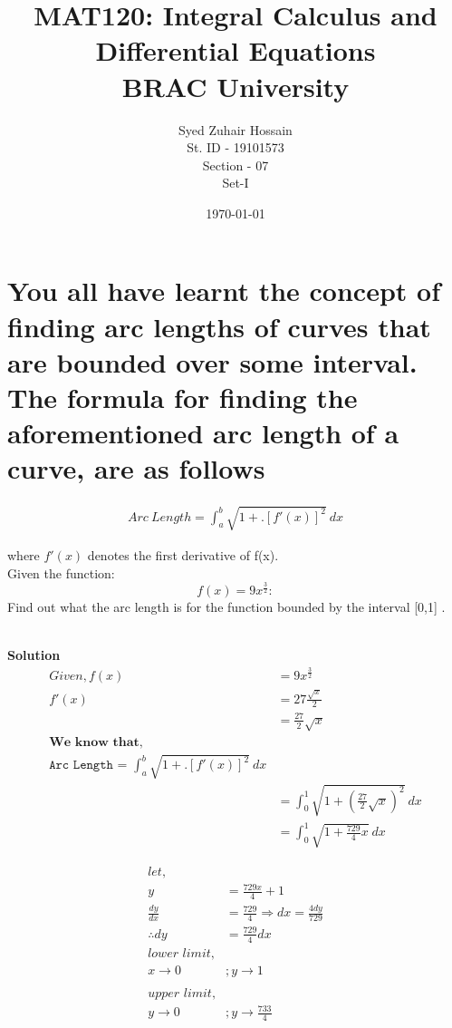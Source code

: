 \documentclass[12pt]{article}
\begin{document}
\title{MAT120: Integral Calculus and
Differential Equations \\
BRAC University}

\author{Syed Zuhair Hossain \\ St. ID - 19101573 \\ Section - 07 \\ Set-I}
\date{\today}
\maketitle


\section{You all have learnt the concept of finding arc lengths of curves that are bounded
over some interval. The formula for finding the aforementioned arc length of a curve, are as follows}


\begin{align*}
    Arc \ Length =  \int_{a}^{b} \sqrt{1+.[f{'}(x)]^2} \ dx
\end{align*}

\begin{paragraph}
where $f{'}(x)$ denotes the first derivative of f(x).\\
Given the function:\\
$$f(x) = 9x^\frac{3}{2}:$$Find out what the arc length is for the function bounded by the interval [0,1] .
\end{paragraph}\\

\textbf{Solution}
\begin{align*}
    Given, f(x) &= 9x^\frac{3}{2}\\
    f{'}(x) &= 27 \frac{\sqrt{x}}{2}\\
            &= \frac{27}{2}\sqrt{x}\\
    \textbf{We know that,} \\
    \texttt{Arc Length = $\int_{a}^{b}  \sqrt{1+.[f{'}(x)]^2} \ dx$}\\
    &= \int_{0}^{1} \sqrt{1+ \left (  \frac{27}{2}\sqrt{x}\right)^2} \ dx\\
    &= \int_{0}^{1} \sqrt{1+ \frac{729}{4}x} \ dx
\end{align*}

\begin{align*}
    let, \\ y&= \frac{729x}{4}+1 \\
    \frac{dy}{dx} &= \frac{729}{4} \Rightarrow dx = \frac{4 dy}{729}\\
    \therefore dy &= \frac{729}{4}dx
    \\ \textit{lower limit,} &\\
    x \rightarrow 0 &; y \rightarrow 1 \\
    \\ \textit{upper limit,} &\\
    y \rightarrow 0 &; y \rightarrow \frac{733}{4}
\end{align*}
\end{document}
